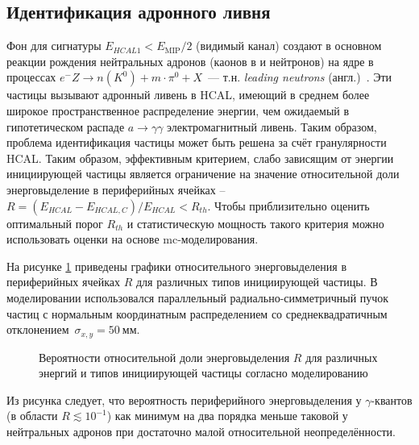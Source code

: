 
\subsection{Идентификация адронного ливня}

Фон для сигнатуры $E_{HCAL1} < E_{\text{MIP}}/2$ (видимый канал)
создают в основном реакции рождения нейтральных адронов (каонов в и нейтронов)
на ядре в процессах $e^{-}Z\rightarrow n(K^0) + m\cdot\pi^0 + X$~---
т.н. \emph{leading neutrons} (англ.)~\cite{leading-neutron-hera}.
Эти частицы вызывают адронный ливень в HCAL, имеющий
в среднем более широкое пространственное распределение энергии,
чем ожидаемый в гипотетическом
распаде $a\rightarrow\gamma\gamma$ электромагнитный ливень.
Таким образом, проблема идентификация частицы
может быть решена за счёт гранулярности HCAL.
Таким образом, эффективным критерием, слабо зависящим от энергии
инициирующей частицы является ограничение на
значение относительной доли энерговыделение в периферийных ячейках --
$R = (E_{HCAL} - E_{HCAL,C})/E_{HCAL} < R_{th}$.
Чтобы приблизительно оценить оптимальный порог $R_{th}$
и статистическую мощность такого критерия можно использовать оценки
на основе \acrshort{mc}-моделирования.

На рисунке \ref{fig:var-ptype-ratios} приведены графики относительного
энерговыделения в периферийных ячейках $R$ для различных типов
инициирующей частицы. В моделировании использовался параллельный
радиально-симметричный пучок частиц с нормальным координатным
распределением со среднеквадратичным
отклонением~$\sigma_{x,y}=50~\text{мм}$.
\begin{figure}[ht]
    \centering
    \resizebox{!}{.35\textwidth}{}
    \resizebox{!}{.35\textwidth}{}
    \resizebox{!}{.35\textwidth}{}
    \resizebox{!}{.35\textwidth}{}
    \caption{Вероятности относительной доли энерговыделения $R$  %
    для различных энергий и типов инициирующей частицы согласно
    моделированию}
    \label{fig:var-ptype-ratios}
\end{figure}
Из рисунка следует, что вероятность периферийного энерговыделения
у $\gamma$-квантов (в области $R \lesssim 10^{-1}$) как
минимум на два порядка меньше таковой у нейтральных адронов при
достаточно малой относительной неопределённости.

